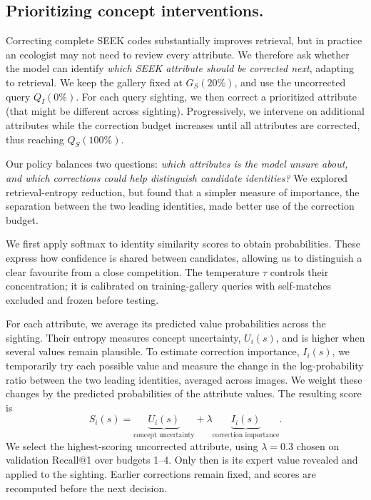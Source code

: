 \subsection{Prioritizing concept interventions.}
Correcting complete SEEK codes substantially improves retrieval, but in practice an ecologist may not need to review every attribute. We therefore ask whether the model can identify \emph{which SEEK attribute should be corrected next}, adapting \cite{chauhan_interactive_2023} to retrieval. We keep the gallery fixed at $G_S(20\%)$, and use the uncorrected query $Q_I(0\%)$. For each query sighting, we then correct a prioritized attribute (that might be different across sighting). Progressively, we intervene on additional attributes while the correction budget increases until all attributes are corrected, thus reaching $Q_S(100\%)$.

Our policy balances two questions: \emph{which attributes is the model unsure about, and which corrections could help distinguish candidate identities?} We explored retrieval-entropy reduction, but found that a simpler measure of importance, the separation between the two leading identities, made better use of the correction budget.

We first apply softmax to identity similarity scores to obtain probabilities. These express how confidence is shared between candidates, allowing us to distinguish a clear favourite from a close competition. The temperature $\tau$ controls their concentration; it is calibrated on training-gallery queries with self-matches excluded and frozen before testing.

For each attribute, we average its predicted value probabilities across the sighting. Their entropy measures concept uncertainty, $U_i(s)$, and is higher when several values remain plausible. To estimate correction importance, $I_i(s)$, we temporarily try each possible value and measure the change in the log-probability ratio between the two leading identities, averaged across images. We weight these changes by the predicted probabilities of the attribute values. The resulting score is
\begin{equation}
S_i(s)=\underbrace{U_i(s)}_{\text{concept uncertainty}}
+\lambda\underbrace{I_i(s)}_{\text{correction importance}}.
\end{equation}
We select the highest-scoring uncorrected attribute, using $\lambda=0.3$ chosen on validation Recall@1 over budgets 1--4. Only then is its expert value revealed and applied to the sighting. Earlier corrections remain fixed, and scores are recomputed before the next decision.

